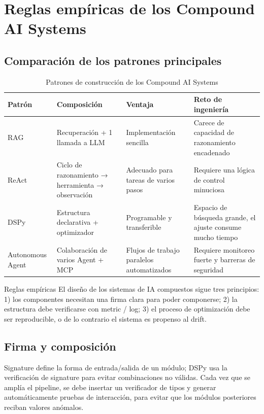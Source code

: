 \section{Reglas empíricas de los Compound AI Systems}

\subsection{Comparación de los patrones principales}

\begin{table}[H]
\centering
\caption{Patrones de construcción de los Compound AI Systems}
\begin{tabular}{p{}p{}p{}p{}}
\toprule
Patrón & Composición & Ventaja & Reto de ingeniería \\
\midrule
RAG & Recuperación + 1 llamada a LLM & Implementación sencilla & Carece de capacidad de razonamiento encadenado \\
ReAct & Ciclo de razonamiento → herramienta → observación & Adecuado para tareas de varios pasos & Requiere una lógica de control minuciosa \\
DSPy & Estructura declarativa + optimizador & Programable y transferible & Espacio de búsqueda grande, el ajuste consume mucho tiempo \\
Autonomous Agent & Colaboración de varios Agent + MCP & Flujos de trabajo paralelos automatizados & Requiere monitoreo fuerte y barreras de seguridad \\
\bottomrule
\end{tabular}
\end{table}

\begin{knowledgebox}{Reglas empíricas}
El diseño de los sistemas de IA compuestos sigue tres principios: 1) los componentes necesitan una firma clara para poder componerse; 2) la estructura debe verificarse con metric / log; 3) el proceso de optimización debe ser reproducible, o de lo contrario el sistema es propenso al drift.
\end{knowledgebox}

\subsection{Firma y composición}

Signature define la forma de entrada/salida de un módulo; DSPy usa la verificación de signature para evitar combinaciones no válidas. Cada vez que se amplía el pipeline, se debe insertar un verificador de tipos y generar automáticamente pruebas de interacción, para evitar que los módulos posteriores reciban valores anómalos.

